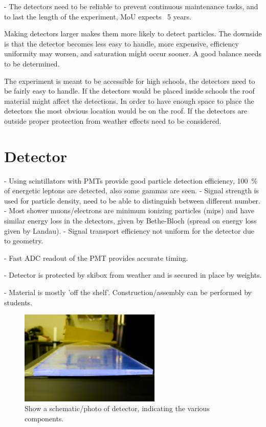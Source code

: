 - The detectors need to be reliable to prevent continuous maintenance tasks, and to last the length of the experiment, MoU expects ~5 years.

Making detectors larger makes them more likely to detect particles. The downside is that the detector becomes less easy to handle, more expensive, efficiency uniformity may worsen, and saturation might occur sooner. A good balance needs to be determined.

The experiment is meant to be accessible for high schools, the detectors need to be fairly easy to handle. If the detectors would be placed inside schools the roof material might affect the detections. In order to have enough space to place the detectors the most obvious location would be on the roof. If the detectors are outside proper protection from weather effects need to be considered.


\section{Detector}


- Using scintillators with PMTs provide good particle detection efficiency, \SI{100}{\percent} of energetic leptons are detected, also some gammas are seen.
    - Signal strength is used for particle density, need to be able to distinguish between different number.
    - Most shower muons/electrons are minimum ionizing particles (mips) and have similar energy loss in the detectors, given by Bethe-Bloch (spread on energy loss given by Landau).
    - Signal transport efficiency not uniform for the detector due to geometry.

- Fast ADC readout of the PMT provides accurate timing.

- Detector is protected by skibox from weather and is secured in place by weights.

- Material is mostly 'off the shelf'. Construction/assembly can be performed by students.

\begin{figure}
    \centering
    \includegraphics[width=0.6\textwidth]
                    {plots/experiment/ADL_115651.jpg}
    \caption{Show a schematic/photo of detector, indicating the various components.}
    \label{fig:schematic_detector}
\end{figure}


